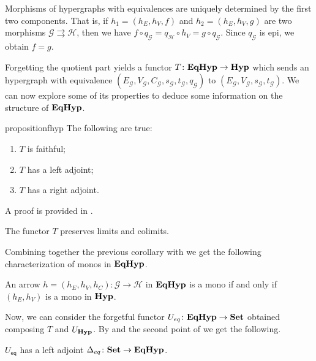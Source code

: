 \documentclass[a4paper,UKenglish,cleveref,pdftex,thm-restate,numberwithinsect]{lipics-v2021}
\newcommand{\eq}{\mathsf{eq}}
\newcommand{\Set}{\mathbf{Set}}
\newcommand{\catname}[1]{\textbf{\textup{#1}}}
\newcommand{\hyp}{\catname{Hyp}}
\newcommand{\EqHyp}{\catname{EqHyp}} %
\begin{document}
\begin{remark}\label{rem:eqhyp_morphs}
	Morphisms of hypergraphs with equivalences are uniquely determined by the first two components. That is, if $h_1 = (h_E, h_V, f)$ and $h_2 = (h_E, h_V, g)$ are two morphisms $\mathcal{G} \rightrightarrows \mathcal{H}$, then we have
	$
	f \circ q_\mathcal{G} = q_\mathcal{H}\circ h_V =g\circ q_\mathcal{G}.
	$
	Since $q_\mathcal{G}$ is epi, we obtain $f = g$.
\end{remark}

Forgetting the quotient part yields a functor $T\colon \EqHyp \to \hyp$ which sends an hypergraph with equivalence $(E_\mathcal{G}, V_{\mathcal{G}}, C_\mathcal{G}, s_\mathcal{G}, t_\mathcal{G}, q_\mathcal{G})$ to $(E_{\mathcal{G}}, V_{\mathcal{G}}, s_\mathcal{G}, t_{\mathcal{G}})$.   We can now explore some of its properties to deduce some information on the structure of $\EqHyp$.  

\begin{restatable}{proposition}{fhyp}\label{prop:forghyp}  The following are true:
	\begin{enumerate}
		\item$T$ is faithful;
		\item $T$ has a left adjoint;
		\item $T$ has a right adjoint.
	\end{enumerate}
\end{restatable}
A proof is provided in .


\begin{corollary}\label{cor:limcolim}
	The functor $T$ preserves limits and colimits.
\end{corollary}

Combining together the previous corollary with  we get the following characterization of monos in $\EqHyp$.

\begin{corollary}\label{cor:mono1}
	An arrow $h = (h_E, h_V, h_C): \mathcal{G \to H}$ in $\EqHyp$ is a mono if and only if $(h_E, h_V)$ is a mono in $\hyp$.
\end{corollary}

Now, we can consider the forgetful functor $U_{\eq}\colon \EqHyp\to \Set$ obtained composing $T$ and $U_{\hyp}$.  By  and the second point of  we get the following.

\begin{corollary}\label{cor:ladj}
	$U_{\eq}$ has a left adjoint $\Delta_{\eq}\colon \Set \to \EqHyp$.
\end{corollary}
\end{document}
